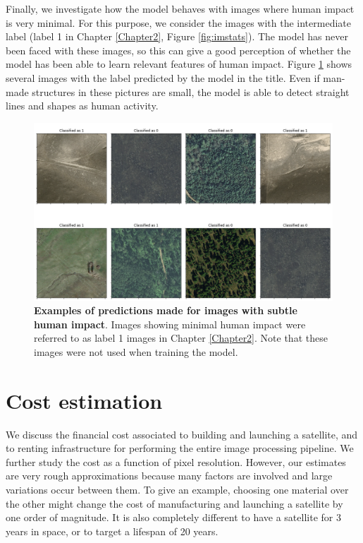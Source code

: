 Finally, we investigate how the model behaves with images where human impact is very minimal. For this purpose, we consider the images with the intermediate label (label 1 in Chapter \ref{Chapter2}, Figure \ref{fig:imstats}). The model has never been faced with these images, so this can give a good perception of whether the model has been able to learn relevant features of human impact. Figure \ref{fig:dataset03m_res03_l1} shows several images with the label predicted by the model in the title. Even if man-made structures in these pictures are small, the model is able to detect straight lines and shapes as human activity. 

\begin{figure}[H]
	\centering
	\captionsetup{width=1\linewidth}
	\includegraphics[width=1\textwidth]{Figures/results/class_dataset03m_res03_l1.png}
	\caption{\textbf{Examples of predictions made for images with subtle human impact}. Images showing minimal human impact were referred to as label 1 images in Chapter \ref{Chapter2}. Note that these images were not used when training the model.}
	\label{fig:dataset03m_res03_l1}
\end{figure}

\section{Cost estimation}

We discuss the financial cost associated to building and launching a satellite, and to renting infrastructure for performing the entire image processing pipeline. We further study the cost as a function of pixel resolution. However, our estimates are very rough approximations because many factors are involved and large variations occur between them. To give an example, choosing one material over the other might change the cost of manufacturing and launching a satellite by one order of magnitude. It is also completely different to have a satellite for 3 years in space, or to target a lifespan of 20 years. 

